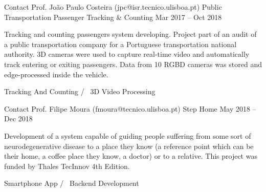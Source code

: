 \begin{cventries}
\cventry
	{Contact Prof. João Paulo Costeira (jpc@isr.tecnico.ulisboa.pt)} %
	{Public Transportation Passenger Tracking \& Counting} %
	{Mar 2017 – Oct 2018} %
	{} %
	{
		\begin{cvitems} %
			Tracking and counting passengers system developing. Project part of an audit of a public transportation company for a Portuguese transportation national authority.
			3D cameras were used to capture real-time video and automatically track entering or exiting passengers.
			Data from 10 RGBD cameras was stored and edge-processed inside the vehicle.
		\end{cvitems}
	}
	{
		Tracking And Counting /~
		3D Video Processing ~
	}

\cventry
{Contact Prof. Filipe Moura (fmoura@tecnico.ulisboa.pt)} %
{Step Home} %
{May 2018 – Dec 2018} %
{} %
{
	\begin{cvitems} %
		Development of a system capable of guiding people suffering from some sort of neurodegenerative disease to a place they know (a reference point which can be their home, a coffee place they know, a doctor) or to a relative. This project was funded by Thales TecInnov 4th Edition.
	\end{cvitems}
}
{
	Smartphone App /~
	Backend Development ~
}



\end{cventries}